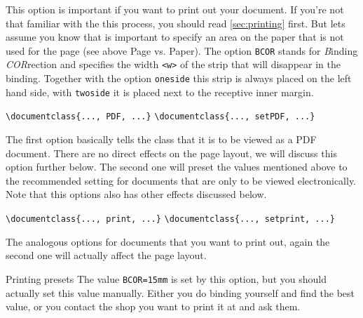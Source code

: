 This option is important if you want to print out your document. If you're not that familiar 
with the this process, you should read \cref{sec:printing} first. But lets assume you know 
that is important to specify an area on the paper that is not used for the page (see above 
Page vs. Paper). The option \lstinline[language={[LaTeX]TeX}]|BCOR| stands for 
\emph{B}inding \emph{COR}rection and specifies the 
width \lstinline[language={[LaTeX]TeX}]|<w>| of the strip that will disappear in the binding. 
Together with the option \lstinline[language={[LaTeX]TeX}]|oneside| this strip is always 
placed on the left hand side, with \lstinline[language={[LaTeX]TeX}]|twoside| it is placed next 
to the receptive inner margin.
\begin{emphBox}
\lstinline[language={[LaTeX]TeX}]|\documentclass{..., PDF, ...}|
\lstinline[language={[LaTeX]TeX}]|\documentclass{..., setPDF, ...}|
\end{emphBox}
The first option basically tells the class that it is to be viewed as a PDF document. 
There are no direct effects on the page layout, we will discuss this option further below.
The second one will preset the values mentioned above to the recommended setting for documents 
that are only to be viewed electronically. Note that this options also has other effects 
discussed below.
\begin{emphBox}
	\lstinline[language={[LaTeX]TeX}]|\documentclass{..., print, ...}|
\lstinline[language={[LaTeX]TeX}]|\documentclass{..., setprint, ...}|
\end{emphBox}
The analogous options for documents that you want to print out, again the second one 
will actually affect the page layout.
\begin{memo}{Printing presets}{}
The value \lstinline[language={[LaTeX]TeX}]|BCOR=15mm| is set by this option, but 
you should actually set this value manually. Either you do binding yourself 
and find the best value, or you contact the shop you want to print it at and ask 
them. 
\end{memo}
\par

